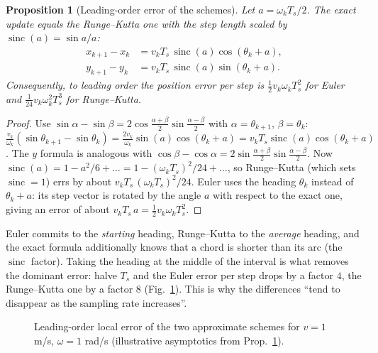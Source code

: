 \documentclass[11pt,a4paper]{article}
\DeclareMathOperator{\sinc}{sinc}
\newcommand{\Ts}{T_s}
\theoremstyle{definition}
\theoremstyle{plain}
\newtheorem{proposition}[definition]{Proposition}
\theoremstyle{remark}
\begin{document}
\begin{proposition}[Leading-order error of the schemes]\label{prop:error}
Let $a=\omega_k\Ts/2$. The exact update equals the Runge--Kutta one with the step length scaled by
$\sinc(a)=\sin a/a$:
\begin{equation}\label{eq:sinc}
\begin{aligned}
x_{k+1}-x_k&=v_k\Ts\,\sinc(a)\cos(\theta_k+a),\\
y_{k+1}-y_k&=v_k\Ts\,\sinc(a)\sin(\theta_k+a).
\end{aligned}
\end{equation}
Consequently, to leading order the position error \emph{per step} is
$\tfrac12 v_k\omega_k\Ts^2$ for Euler and $\tfrac1{24}v_k\omega_k^2\Ts^3$ for Runge--Kutta.
\end{proposition}
\begin{proof}
Use $\sin\alpha-\sin\beta=2\cos\frac{\alpha+\beta}2\sin\frac{\alpha-\beta}2$ with $\alpha=\theta_{k+1}$,
$\beta=\theta_k$:
$\frac{v_k}{\omega_k}(\sin\theta_{k+1}-\sin\theta_k)=\frac{2v_k}{\omega_k}\sin(a)\cos(\theta_k+a)=v_k\Ts\sinc(a)\cos(\theta_k+a)$.
The $y$ formula is analogous with $\cos\beta-\cos\alpha=2\sin\frac{\alpha+\beta}2\sin\frac{\alpha-\beta}2$.
Now $\sinc(a)=1-a^2/6+\dots=1-(\omega_k\Ts)^2/24+\dots$, so Runge--Kutta (which sets $\sinc=1$) errs by
about $v_k\Ts\,(\omega_k\Ts)^2/24$. Euler uses the heading $\theta_k$ instead of $\theta_k+a$: its step vector
is rotated by the angle $a$ with respect to the exact one, giving an error of about $v_k\Ts\,a=\tfrac12v_k\omega_k\Ts^2$.
\end{proof}

\begin{intuition}
Euler commits to the \emph{starting} heading, Runge--Kutta to the \emph{average} heading, and the exact
formula additionally knows that a chord is shorter than its arc (the $\sinc$ factor). Taking the heading
at the middle of the interval is what removes the dominant error: halve $\Ts$ and the Euler error per step
drops by a factor $4$, the Runge--Kutta one by a factor $8$ (Fig.~\ref{fig:rates}). This is why the
differences ``tend to disappear as the sampling rate increases''.
\end{intuition}

\begin{figure}[H]
\centering
{}
\caption{Leading-order local error of the two approximate schemes for $v=1$ m/s, $\omega=1$ rad/s
(illustrative asymptotics from Prop.~\ref{prop:error}).}\label{fig:rates}
\end{figure}
\end{document}
